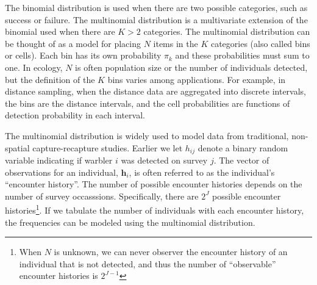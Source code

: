 The binomial distribution is used
when there are two possible categories, such as success or failure. %
The multinomial distribution is a multivariate extension of
the binomial used when there are $K>2$ categories.
The multinomial distribution can be thought of as a model for placing
$N$ items in the $K$ categories (also called bins or cells). Each bin has
its own probability $\pi_k$ and these probabilities must sum to one.
In ecology, $N$ is often population size or the number of individuals
detected, but the definition of the $K$ bins varies among
applications. For example, in distance sampling, when the distance
data are aggregated into discrete intervals,
the bins are the distance intervals, and the cell probabilities are
functions of detection probability in each interval.

The multinomial distribution is widely used to model data from traditional,
non-spatial capture-recapture studies.
Earlier we let $h_{ij}$ denote a binary random variable indicating if
warbler $i$ was detected on survey $j$. The vector of observations for an
individual, $\mathbf{h}_i$, is often referred to as the individual's
``encounter history''. The number of possible encounter
histories depends on the number of survey occasssions. Specifically,
there are $2^J$
possible encounter histories\footnote{When $N$ is unknown, we can
  never observer the encounter history of an individual that is not
  detected, and thus the number of ``observable'' encounter histories
  is $2^{J-1}$}.
If we tabulate the number of individuals with each encounter history,
the frequencies can be modeled using the multinomial
distribution. %

